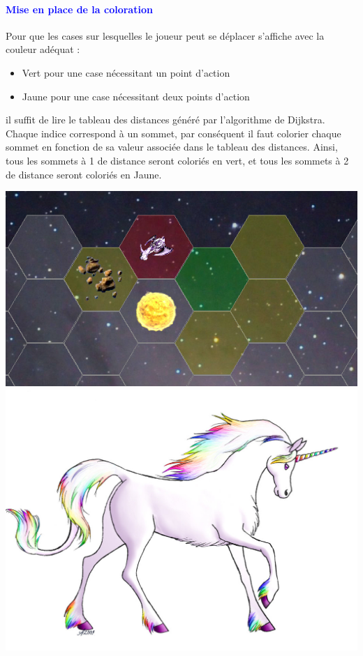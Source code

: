 \documentclass{report}
\begin{document}
			\paragraph{\textcolor{blue}{Mise en place de la coloration}}
			Pour que les cases sur lesquelles le joueur peut se déplacer s'affiche avec la couleur adéquat : 
			\begin{itemize}
				\item Vert pour une case nécessitant un point d'action
				\item Jaune pour une case nécessitant deux points d'action
			\end{itemize}
			il suffit de lire le tableau des distances généré par l'algorithme de Dijkstra. Chaque indice correspond à un sommet, par conséquent il faut colorier chaque sommet en fonction de sa valeur associée dans le tableau des distances. Ainsi, tous les sommets à 1 de distance seront coloriés en vert, et tous les sommets à 2 de distance seront coloriés en Jaune.\\[2cm]
			\begin{center} 
      
          \includegraphics[scale=0.75]{Images/Coloration.png} 
          \\[2cm]
          \includegraphics[scale=1]{Images/Licornes.jpg}
     
      \end{center}
			
\end{document}
